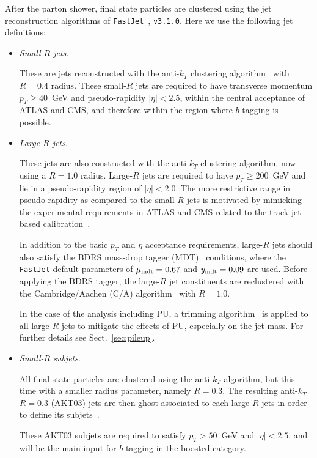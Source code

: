 After the parton shower, final state particles
are clustered using the
jet reconstruction algorithms
of
{\tt FastJet}~\cite{Cacciari:2011ma,Cacciari:2005hq},
{\tt v3.1.0}.
%
Here we use the following jet definitions:
\begin{itemize}
\item {\it Small-$R$ jets}.

  These are jets  reconstructed with the
  anti-$k_T$ clustering algorithm~\cite{Cacciari:2008gp} with $R=0.4$ radius.
  These small-$R$ jets are required
  to have transverse momentum $p_T \ge 40$~GeV
  and pseudo-rapidity $|\eta|<2.5$, within the central 
  acceptance of ATLAS and CMS, and therefore within the region
  where $b$-tagging is possible.

\item {\it Large-$R$ jets}.

  These jets are also constructed with the
  anti-$k_T$ clustering algorithm, now using a $R=1.0$ radius.
  Large-$R$ jets are required to have
  $p_T \ge 200$~GeV and lie in a pseudo-rapidity region of
  $|\eta|<2.0$.
  The more restrictive range  in pseudo-rapidity
  as compared to the small-$R$ jets
  is motivated by mimicking the  experimental requirements
  in ATLAS and CMS
  related to the track-jet based calibration~\cite{Aad:2014bia,ATLAS:2012kla}.

  In addition to the basic $p_T$ and $\eta$
  acceptance requirements, large-$R$ jets should also
  satisfy the  BDRS mass-drop tagger (MDT)~\cite{Butterworth:2008iy}
  conditions, where the {\tt FastJet} default
  parameters of  $\mu_{\rm mdt} = 0.67$ and $y_{\rm mdt}=0.09$ are used.
  Before applying the BDRS tagger, the large-$R$ jet
  constituents are reclustered with the Cambridge/Aachen (C/A)
  algorithm~\cite{Dokshitzer:1997in,Wobisch:1998wt}
  with $R=1.0$.

  In the case of the analysis including PU, a trimming
  algorithm~\cite{Krohn:2009th}
  is applied to all large-$R$ jets to mitigate the effects of PU,
  especially on the jet mass.
  For further details see Sect.~\ref{sec:pileup}.
  
\item {\it Small-$R$ subjets}.

 All final-state particles are clustered using the
 anti-$k_T$ algorithm, but this time with
 a smaller radius parameter, namely $R=0.3$.
 The resulting anti-$k_T$ $R=0.3$ (AKT03) jets
 are then ghost-associated to each large-$R$ jets
 in order to define its subjets~\cite{Aad:2015uka}.

 These AKT03 subjets
  are required to satisfy
  $p_T > 50$~GeV and $|\eta|<2.5$, and
   will be the main input for
  $b$-tagging in the boosted category.
\end{itemize}

